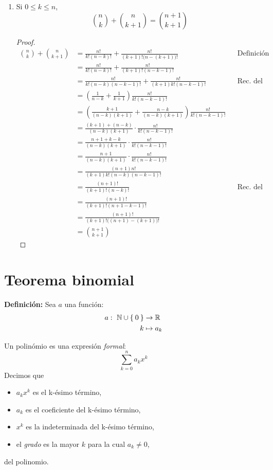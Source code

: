 \begin{enumerate}[label=\alph*)]
  \item Si $0\leq k \leq n$, \[\binom{n}{k} + \binom{n}{k+1} = \binom{n+1}{k+1}\]
  \begin{proof}\leavevmode
    \begin{align*}
      \binom{n}{k} + \binom{n}{k+1} &= \frac{n!}{k!(n-k)!} + \frac{n!}{(k+1)!\big(n-(k+1)\big)!} && \text{Definición}\\
      &= \frac{n!}{k!(n-k)!} + \frac{n!}{(k+1)!(n-k-1)!} \\ 
      &= \frac{n!}{k!(n-k)(n-k-1)!} + \frac{n!}{(k+1)k!(n-k-1)!}&& \text{Rec. del factorial} \\
      &= \left(\frac{1}{n-k} + \frac{1}{k+1}\right) \frac{n!}{k!(n-k-1)!}\\
      &= \left(\frac{k+1}{(n-k)(k+1)} + \frac{n-k}{(n-k)(k+1)}\right) \frac{n!}{k!(n-k-1)!} \\
      &= \frac{(k+1)+(n-k)}{(n-k)(k+1)} \cdot \frac{n!}{k!(n-k-1)!}\\
      &= \frac{n+1+k-k}{(n-k)(k+1)} \cdot \frac{n!}{k!(n-k-1)!} \\ 
      &= \frac{n+1}{(n-k)(k+1)} \cdot \frac{n!}{k!(n-k-1)!} \\ 
      &= \frac{(n+1)n!}{(k+1)k!(n-k)(n-k-1)!}\\
      &= \frac{(n+1)!}{(k+1)!(n-k)!} && \text{Rec. del factorial}\\
      &= \frac{(n+1)!}{(k+1)!(n+1-k-1)!}\\
      &= \frac{(n+1)!}{(k+1)!\big((n+1)-(k+1)\big)!}\\
      &= \binom{n+1}{k+1}
    \end{align*}
  \end{proof}
\end{enumerate}

\clearpage
\pagebreak

\section*{Teorema binomial}

\textbf{Definición:} Sea $a$ una función:
\begin{align*}
 a: \ \mathbb{N}\cup\Set{0} &\to \mathbb{R} \\
 \  k &\mapsto a_k
\end{align*}

Un polinómio es una expresión \textit{formal}: \[\sum_{k=0}^{n} a_k x^k\]
Decimos que
\begin{itemize}
  \item $a_k x^k$ es el k-ésimo término,
  \item $a_k$ es el coeficiente del k-ésimo término,
  \item $x^k$ es la indeterminada del k-ésimo término,
  \item el \textit{grado} es la mayor $k$ para la cual $a_k\neq 0$,
\end{itemize}
del polinomio.

